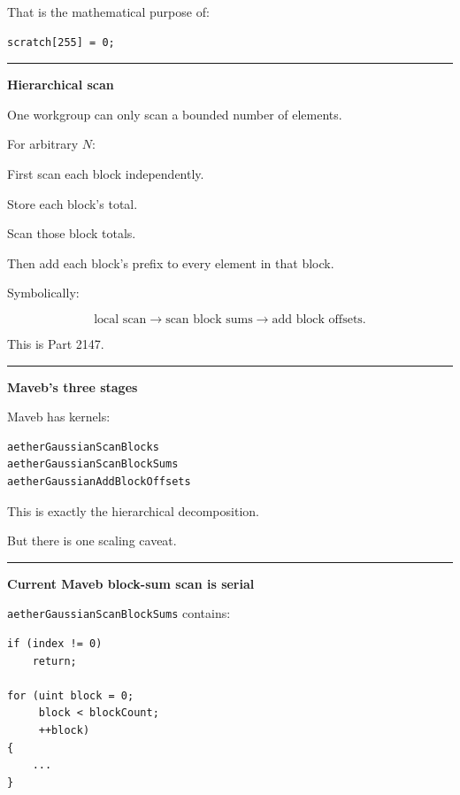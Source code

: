 That is the mathematical purpose of:

\protect{}\label{t9o8ez}%
\begin{verbatim}
scratch[255] = 0;
\end{verbatim}

\begin{center}\rule{0.5\linewidth}{0.5pt}\end{center}

\textbf{Hierarchical scan}

One workgroup can only scan a bounded number of elements.

For arbitrary \(N\):

First scan each block independently.

Store each block's total.

Scan those block totals.

Then add each block's prefix to every element in that block.

Symbolically:

\[
\boxed{
\text{local scan}
\rightarrow
\text{scan block sums}
\rightarrow
\text{add block offsets}.
}
\]

This is Part 2147.

\begin{center}\rule{0.5\linewidth}{0.5pt}\end{center}

\textbf{Maveb's three stages}

Maveb has kernels:

\protect{}\label{r92vsu}%
\begin{verbatim}
aetherGaussianScanBlocks
aetherGaussianScanBlockSums
aetherGaussianAddBlockOffsets
\end{verbatim}

This is exactly the hierarchical decomposition.

But there is one scaling caveat.

\begin{center}\rule{0.5\linewidth}{0.5pt}\end{center}

\textbf{Current Maveb block-sum scan is serial}

\texttt{aetherGaussianScanBlockSums} contains:

\protect{}\label{qa2bts}%
\begin{verbatim}
if (index != 0)
    return;

for (uint block = 0;
     block < blockCount;
     ++block)
{
    ...
}
\end{verbatim}

